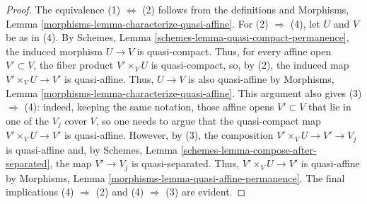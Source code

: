 \documentclass[10pt,a4paper]{amsart}
\theoremstyle{plain}
\theoremstyle{definition}
\theoremstyle{remark}
\numberwithin{equation}{subsection}
\begin{document}
\begin{proof}
The equivalence (1) $\Leftrightarrow$ (2)
follows from the definitions and
Morphisms, Lemma \ref{morphisms-lemma-characterize-quasi-affine}.
For (2) $\Rightarrow$ (4), let $U$ and $V$ be as in (4). By
Schemes, Lemma \ref{schemes-lemma-quasi-compact-permanence}, the
induced morphism $U \to V$ is quasi-compact. Thus, for every affine
open $V' \subset V$, the fiber product $V' \times_V U$ is quasi-compact,
so, by (2), the induced map $V' \times_V U \to V'$ is quasi-affine.
Thus, $U \to V$ is also quasi-affine by
Morphisms, Lemma \ref{morphisms-lemma-characterize-quasi-affine}.
This argument also gives (3) $\Rightarrow$ (4): indeed, keeping the
same notation, those affine opens $V' \subset V$ that lie in one
of the $V_j$ cover $V$, so one needs to argue that the
quasi-compact map $V' \times_V U \to V'$ is quasi-affine.
However, by (3), the composition $V' \times_V U \to V' \to V_j$
is quasi-affine and, by
Schemes, Lemma \ref{schemes-lemma-compose-after-separated}, the map
$V' \to V_j$ is quasi-separated. Thus, $V' \times_V U \to V'$
is quasi-affine by
Morphisms, Lemma \ref{morphisms-lemma-quasi-affine-permanence}.
The final implications (4) $\Rightarrow$ (2) and (4) $\Rightarrow$ (3)
are evident.
\end{proof}
\end{document}
